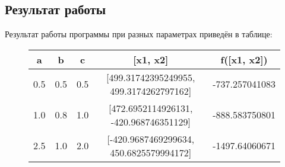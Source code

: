 \documentclass[12pt,a4paper,oneside]{extarticle}
\begin{document}
    \subsection{Результат работы}
        Результат работы программы при разных параметрах приведён в таблице:
        \begin{figure} [ht]
            \centering
            \begin{tabular}{ |c|c|c|c|c| }
                \hline
                a & b & c & [x1, x2] & f([x1, x2]) \\ \hline
                0.5 & 0.5 & 0.5 & [499.31742395249955, 499.3174262797162] & -737.257041083 \\ \hline
                1.0 & 0.8 & 1.0 & [472.6952114926131, -420.968746351129] & -888.583750801 \\ \hline
                2.5 & 1.0 & 2.0 & [-420.9687469299634, 450.6825579994172] & -1497.64060671 \\ \hline
            \end{tabular}
        \end{figure}
\end{document}
